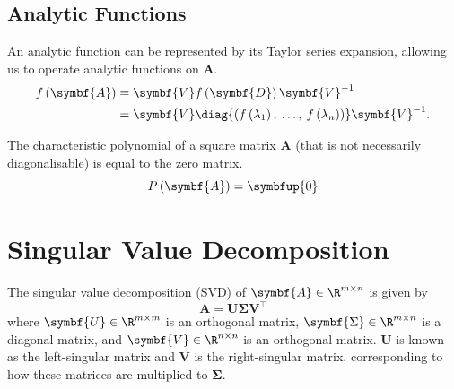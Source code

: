 \documentclass{article}
\begin{document}
\subsection{Analytic Functions}
An analytic function can be represented by its Taylor series expansion, allowing us to operate analytic functions on \(\symbf{A}\).
\begin{align*}
    f\left( \symbf{A} \right) & = \symbf{V} f\left( \symbf{D} \right) \symbf{V}^{-1}                                                               \\
                              & = \symbf{V} \diag{\left( f\left( \lambda_1 \right),\: \ldots,\: f\left( \lambda_n \right) \right)} \symbf{V}^{-1}.
\end{align*}
\begin{theorem}
    The characteristic polynomial of a square matrix \(\symbf{A}\) (that is not necessarily diagonalisable)
    is equal to the zero matrix.
    \begin{equation*}
        P\left( \symbf{A} \right) = \symbfup{0}
    \end{equation*}
\end{theorem}
\section{Singular Value Decomposition}
The singular value decomposition (SVD) of \(\symbf{A} \in \R^{m \times n}\) is given by
\begin{equation*}
    \symbf{A} = \symbf{U} \symbf{\Sigma} \symbf{V}^\top
\end{equation*}
where \(\symbf{U} \in \R^{m \times m}\) is an orthogonal matrix, \(\symbf{\Sigma} \in \R^{m \times n}\)
is a diagonal matrix, and \(\symbf{V} \in  \R^{n \times n}\) is
an orthogonal matrix.
\(\symbf{U}\) is known as the left-singular matrix and \(\symbf{V}\) is the right-singular matrix,
corresponding to how these matrices are multiplied to \(\symbf{\Sigma}\).
\end{document}
